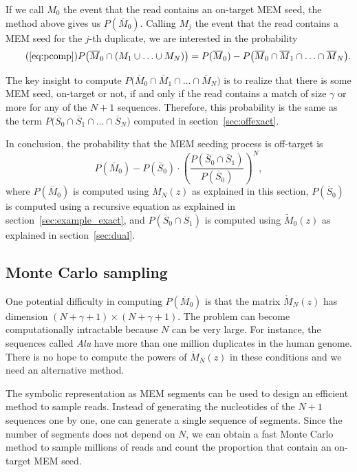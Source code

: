 \documentclass{article}
\begin{document}
If we call $M_0$ the event that the read contains an on-target MEM seed,
the method above gives us $P(\overline{M}_0)$. Calling $M_j$ the event
that the read contains a MEM seed for the $j$-th duplicate, we are
interested in the probability
\begin{equation*}
\tag{\ref{eq:pcomp}}
P\big(\overline{M}_0 \cap (M_1 \cup \ldots \cup M_N)\big) =
P(\overline{M}_0) - P\big(\overline{M}_0 \cap \overline{M}_1 \cap \ldots
\cap \overline{M}_N\big).
\end{equation*}

The key insight to compute $P\big(\overline{M}_0 \cap \overline{M}_1 \cap
\ldots \cap \overline{M}_N\big)$ is to realize that there is some MEM
seed, on-target or not, if and only if the read contains a match of size
$\gamma$ or more for any of the $N+1$ sequences. Therefore, this
probability is the same as the term $P\big(\overline{S}_0 \cap
\overline{S}_1 \cap \ldots \cap \overline{S}_N\big)$ computed in
section~\ref{sec:offexact}.

In conclusion, the probability that the MEM seeding process is off-target
is
\begin{equation}
\label{eq:PMEM}
P(\overline{M}_0) - P(\overline{S}_0) \cdot \left( \frac{P(\overline{S}_0
\cap \overline{S}_1)}{P(\overline{S}_0)} \right)^N,
\end{equation}
where $P(\overline{M}_0)$ is computed using $\mathring{M}_N(z)$ as
explained in this section, $P(\overline{S}_0)$ is computed using a
recursive equation as explained in section~\ref{sec:example_exact}, and
$P(\overline{S}_0\cap\overline{S}_1)$ is computed using $\tilde{M}_0(z)$
as explained in section~\ref{sec:dual}.

\subsection{Monte Carlo sampling}
\label{sec:montecarlo}

One potential difficulty in computing $P(\overline{M}_0)$ is that the
matrix $\mathring{M}_N(z)$ has dimension $(N+\gamma+1) \times
(N+\gamma+1)$. The problem can become computationally intractable because
$N$ can be very large. For instance, the sequences called \emph{Alu} have
more than one million duplicates in the human genome. There is no hope to
compute the powers of $\mathring{M}_N(z)$ in these conditions and we need
an alternative method.

The symbolic representation as MEM segments can be used to design an
efficient method to sample reads. Instead of generating the nucleotides of
the $N+1$ sequences one by one, one can generate a single sequence of
segments. Since the number of segments does not depend on $N$, we can
obtain a fast Monte Carlo method to sample millions of reads and count the
proportion that contain an on-target MEM seed.
\end{document}
